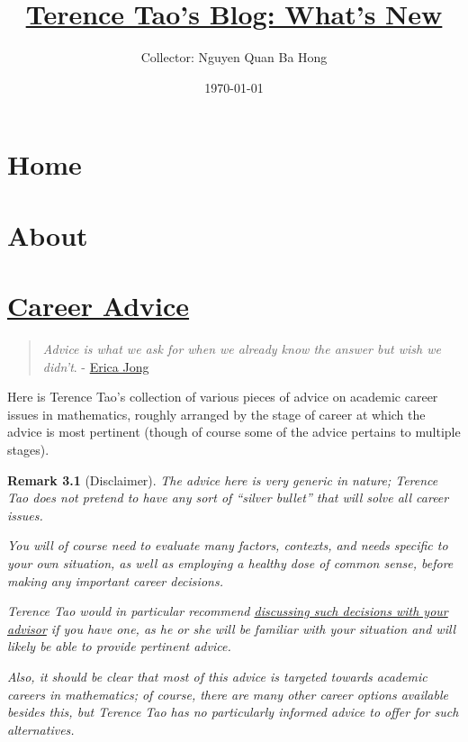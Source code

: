 \documentclass{book}
\title{\href{https://terrytao.wordpress.com/}{Terence Tao's Blog: What's New}}
\author{Collector: Nguyen Quan Ba Hong}
\date{\today}
\numberwithin{equation}{section}
\newtheorem{remark}{Remark}[section]
\begin{document}
\maketitle
\setcounter{secnumdepth}{6}
\setcounter{tocdepth}{6}
\tableofcontents


\chapter{Home}


\chapter{About}


\chapter{\href{https://terrytao.wordpress.com/career-advice/}{Career Advice}}

\begin{quotation}
    \textit{Advice is what we ask for when we already know the answer but wish we didn't}. - \href{http://en.wikipedia.org/wiki/Erica_Jong}{Erica Jong}
\end{quotation}
Here is Terence Tao's collection of various pieces of advice on academic career issues in mathematics, roughly arranged by the stage of career at which the advice is most pertinent (though of course some of the advice pertains to multiple stages).

\begin{remark}[Disclaimer]
    The advice here is very generic in nature; Terence Tao does not pretend to have any sort of ``silver bullet'' that will solve all career issues.
    
    You will of course need to evaluate many factors, contexts, and needs specific to your own situation, as well as employing a healthy dose of common sense, before making any important career decisions.
    
    Terence Tao would in particular recommend \href{https://terrytao.wordpress.com/career-advice/talk-to-your-advisor/}{discussing such decisions with your advisor} if you have one, as he or she will be familiar with your situation and will likely be able to provide pertinent advice.
    
    Also, it should be clear that most of this advice is targeted towards academic careers in mathematics; of course, there are many other career options available besides this, but Terence Tao has no particularly informed advice to offer for such alternatives.
\end{remark}
\end{document}
